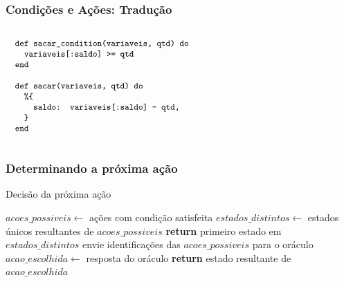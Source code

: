 \documentclass{beamer}
\begin{document}
\begin{frame}
  \frametitle{Condições e Ações: Tradução}
  $\progfig{
  ~~def sacar\_condition(variaveis, qtd) do\\
  ~~~~variaveis[:saldo] >= qtd\\
  ~~end\\\\
  ~~def sacar(variaveis, qtd) do\\
  ~~~~\%\{\\
  ~~~~~~saldo: variaveis[:saldo] - qtd,\\
  ~~~~\}\\
  ~~end
  }$
\end{frame}

\begin{frame}
  \frametitle{Determinando a próxima ação}
  \begin{algorithm}[H]
    \caption{Decisão da próxima ação}\label{alg:decide-action}
    \begin{algorithmic}[1]
      \State $acoes\_possiveis\gets$ ações com condição satisfeita
      \State $estados\_distintos\gets$ estados únicos resultantes de $acoes\_possiveis$
      \State \textbf{return} primeiro estado em $estados\_distintos$
      \Else{}
      \State envie identificações das $acoes\_possiveis$ para o oráculo
      \State $acao\_escolhida\gets$ resposta do oráculo
      \State \textbf{return} estado resultante de $acao\_escolhida$
      \EndIf
      \EndProcedure
    \end{algorithmic}
  \end{algorithm}
\end{frame}
\end{document}
